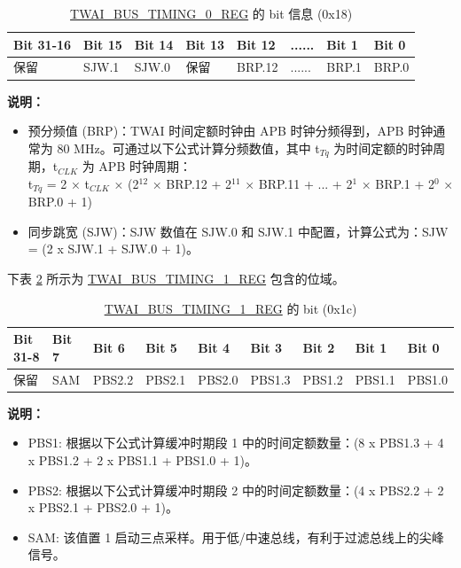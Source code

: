 \documentclass[main\_\_CN.tex]{subfiles}
\begin{document}
\begin{longtable}[c]{|p{2cm}|p{1.5cm}|p{1.5cm}|p{1.5cm}|p{1.5cm}|p{1.5cm}|p{1.5cm}|p{1.5cm}|}
\caption{\hyperref[regdesc:TWAIBUSTIMING0REG]{TWAI\_BUS\_TIMING\_0\_REG} 的 bit 信息 (0x18)}
\label{tab:twai-bit-info-bus-timing-0-reg}\\\hline
\rowcolor{lightgray}
  \textbf{Bit 31-16} & \textbf{Bit 15} & \textbf{Bit 14} & \textbf{Bit 13} & \textbf{Bit 12} & \textbf{......} & \textbf{Bit 1} & \textbf{Bit 0}\\\hline 
  保留& SJW.1 & SJW.0 & 保留 & BRP.12 & ...... & BRP.1 & BRP.0\\\hline
\end{longtable}
\vspace{-1.5em}
{\bfseries 说明：}\\
\begin{itemize}
    \item 预分频值 (BRP)：TWAI 时间定额时钟由 APB 时钟分频得到，APB 时钟通常为 80 MHz。可通过以下公式计算分频数值，其中 t$_{Tq}$ 为时间定额的时钟周期，t$_{CLK}$ 为 APB 时钟周期：\\

t$_{Tq}$ = 2 × t$_{CLK}$ × (2$^{12}$ × BRP.12 + 2$^{11}$ × BRP.11 + ... + 2$^1$ × BRP.1 + 2$^0$ × BRP.0 + 1)
    \item 同步跳宽 (SJW)：SJW 数值在 SJW.0 和 SJW.1 中配置，计算公式为：SJW = (2 x SJW.1 + SJW.0 + 1)。
\end{itemize}

下表 \ref{tab:twai-bit-info-bus-timing-1-reg} 所示为 \hyperref[regdesc:TWAIBUSTIMING1REG]{TWAI\_BUS\_TIMING\_1\_REG} 包含的位域。

\begin{longtable}[c]{|p{1.4cm}|p{1.4cm}|p{1.4cm}|p{1.4cm}|p{1.4cm}|p{1.4cm}|p{1.4cm}|p{1.4cm}|p{1.4cm}|}
    \caption{\hyperref[regdesc:TWAIBUSTIMING1REG]{TWAI\_BUS\_TIMING\_1\_REG} 的 bit (0x1c)}
    \label{tab:twai-bit-info-bus-timing-1-reg}\\
    \hline
       \rowcolor{lightgray}
   \textbf{Bit 31-8} & \textbf{Bit 7} & \textbf{Bit 6} & \textbf{Bit 5} & \textbf{Bit 4} & \textbf{Bit 3} & \textbf{Bit 2} & \textbf{Bit 1} & \textbf{Bit 0}\\\hline 
   保留 & SAM & PBS2.2 & PBS2.1 & PBS2.0 & PBS1.3 &PBS1.2 & PBS1.1 & PBS1.0\\
    \hline
\end{longtable}
\vspace{-1.5em}
{\bfseries 说明：}\\
\begin{itemize}
    \item PBS1: 根据以下公式计算缓冲时期段 1 中的时间定额数量：(8 x PBS1.3 + 4 x PBS1.2 + 2 x PBS1.1 + PBS1.0 + 1)。
    \item PBS2: 根据以下公式计算缓冲时期段 2 中的时间定额数量：(4 x PBS2.2 + 2 x PBS2.1 + PBS2.0 + 1)。
    \item SAM: 该值置 1 启动三点采样。用于低/中速总线，有利于过滤总线上的尖峰信号。
\end{itemize}
\end{document}

